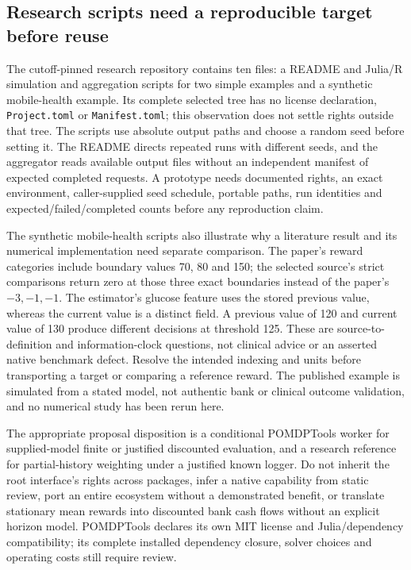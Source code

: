 \subsection{Research scripts need a reproducible target before reuse}
The cutoff-pinned research repository contains ten files: a README and Julia/R
simulation and aggregation scripts for two simple examples and a synthetic
mobile-health example. Its complete selected tree has no license declaration,
\texttt{Project.toml} or \texttt{Manifest.toml}; this observation does not settle
rights outside that tree. The scripts use absolute output paths and choose a
random seed before setting it. The README directs repeated runs with different
seeds, and the aggregator reads available output files without an independent
manifest of expected completed requests. A prototype needs documented rights,
an exact environment, caller-supplied seed schedule, portable paths, run identities
and expected/failed/completed counts before any reproduction claim.
\citep{exec24_policyother_ope}

The synthetic mobile-health scripts also illustrate why a literature result
and its numerical implementation need separate comparison. The paper's reward
categories include boundary values 70, 80 and 150; the selected source's strict
comparisons return zero at those three exact boundaries instead of the paper's
$-3,-1,-1$. The estimator's glucose feature uses the stored previous value,
whereas the current value is a distinct field. A previous value of 120 and
current value of 130 produce different decisions at threshold 125. These
are source-to-definition and information-clock questions, not clinical advice
or an asserted native benchmark defect. Resolve the intended indexing and
units before transporting a target or comparing a reference reward. The
published example is simulated from a stated model, not authentic bank or
clinical outcome validation, and no numerical study has been rerun here.
\citep{exec24_policyother_original,exec24_policyother_ope,exec24_policyother_contract}

The appropriate proposal disposition is a conditional POMDPTools worker for
supplied-model finite or justified discounted evaluation, and a research
reference for partial-history weighting under a justified known logger.
Do not inherit the root interface's rights across packages, infer a native
capability from static review, port an entire ecosystem without a demonstrated
benefit, or translate stationary mean rewards into discounted bank cash flows
without an explicit horizon model. POMDPTools declares its own MIT license
and Julia/dependency compatibility; its complete installed dependency closure,
solver choices and operating costs still require review.
\citep{exec24_policyother_tools,exec24_policyother_contract}

